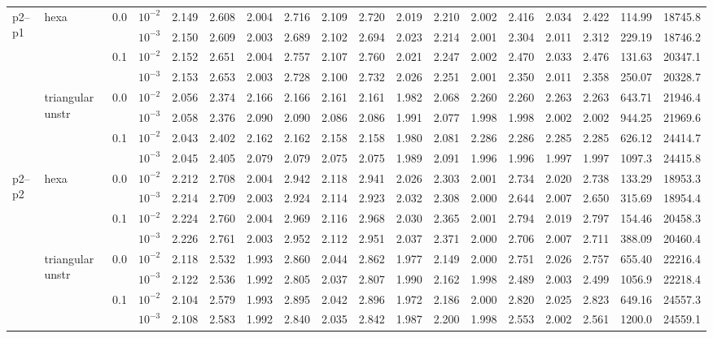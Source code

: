 \begin{longtable}{llclrrrrrrrrrrrrrr}
\multirow{8}{*}{p2--p1} & \multirow{4}{*}{hexa} & \multirow{2}{*}{0.0} & $10^{-2}$ & 2.149 & 2.608 & 2.004 & 2.716 & 2.109 & 2.720 & 2.019 & 2.210 & 2.002 & 2.416 & 2.034 & 2.422 & 114.99 & 18745.8 \\
& & & $10^{-3}$ & 2.150 & 2.609 & 2.003 & 2.689 & 2.102 & 2.694 & 2.023 & 2.214 & 2.001 & 2.304 & 2.011 & 2.312 & 229.19 & 18746.2 \\\cline{3-18}
& & \multirow{2}{*}{0.1} & $10^{-2}$ & 2.152 & 2.651 & 2.004 & 2.757 & 2.107 & 2.760 & 2.021 & 2.247 & 2.002 & 2.470 & 2.033 & 2.476 & 131.63 & 20347.1 \\
& & & $10^{-3}$ & 2.153 & 2.653 & 2.003 & 2.728 & 2.100 & 2.732 & 2.026 & 2.251 & 2.001 & 2.350 & 2.011 & 2.358 & 250.07 & 20328.7 \\\cline{2-18}
& \multirow{4}{*}{triangular unstr} & \multirow{2}{*}{0.0} & $10^{-2}$ & 2.056 & 2.374 & 2.166 & 2.166 & 2.161 & 2.161 & 1.982 & 2.068 & 2.260 & 2.260 & 2.263 & 2.263 & 643.71 & 21946.4 \\
& & & $10^{-3}$ & 2.058 & 2.376 & 2.090 & 2.090 & 2.086 & 2.086 & 1.991 & 2.077 & 1.998 & 1.998 & 2.002 & 2.002 & 944.25 & 21969.6 \\\cline{3-18}
& & \multirow{2}{*}{0.1} & $10^{-2}$ & 2.043 & 2.402 & 2.162 & 2.162 & 2.158 & 2.158 & 1.980 & 2.081 & 2.286 & 2.286 & 2.285 & 2.285 & 626.12 & 24414.7 \\
& & & $10^{-3}$ & 2.045 & 2.405 & 2.079 & 2.079 & 2.075 & 2.075 & 1.989 & 2.091 & 1.996 & 1.996 & 1.997 & 1.997 & 1097.3 & 24415.8 \\\hline

\multirow{8}{*}{p2--p2} & \multirow{4}{*}{hexa} & \multirow{2}{*}{0.0} & $10^{-2}$ & 2.212 & 2.708 & 2.004 & 2.942 & 2.118 & 2.941 & 2.026 & 2.303 & 2.001 & 2.734 & 2.020 & 2.738 & 133.29 & 18953.3 \\
& & & $10^{-3}$ & 2.214 & 2.709 & 2.003 & 2.924 & 2.114 & 2.923 & 2.032 & 2.308 & 2.000 & 2.644 & 2.007 & 2.650 & 315.69 & 18954.4 \\\cline{3-18}
& & \multirow{2}{*}{0.1} & $10^{-2}$ & 2.224 & 2.760 & 2.004 & 2.969 & 2.116 & 2.968 & 2.030 & 2.365 & 2.001 & 2.794 & 2.019 & 2.797 & 154.46 & 20458.3 \\
& & & $10^{-3}$ & 2.226 & 2.761 & 2.003 & 2.952 & 2.112 & 2.951 & 2.037 & 2.371 & 2.000 & 2.706 & 2.007 & 2.711 & 388.09 & 20460.4 \\\cline{2-18}
& \multirow{4}{*}{triangular unstr} & \multirow{2}{*}{0.0} & $10^{-2}$ & 2.118 & 2.532 & 1.993 & 2.860 & 2.044 & 2.862 & 1.977 & 2.149 & 2.000 & 2.751 & 2.026 & 2.757 & 655.40 & 22216.4 \\
& & & $10^{-3}$ & 2.122 & 2.536 & 1.992 & 2.805 & 2.037 & 2.807 & 1.990 & 2.162 & 1.998 & 2.489 & 2.003 & 2.499 & 1056.9 & 22218.4 \\\cline{3-18}
& & \multirow{2}{*}{0.1} & $10^{-2}$ & 2.104 & 2.579 & 1.993 & 2.895 & 2.042 & 2.896 & 1.972 & 2.186 & 2.000 & 2.820 & 2.025 & 2.823 & 649.16 & 24557.3 \\
& & & $10^{-3}$ & 2.108 & 2.583 & 1.992 & 2.840 & 2.035 & 2.842 & 1.987 & 2.200 & 1.998 & 2.553 & 2.002 & 2.561 & 1200.0 & 24559.1 \\\hline


\end{longtable}
